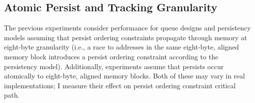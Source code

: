 %
%
%
%

\subsection{Atomic Persist and Tracking Granularity}
\label{section:Evaluation:Granularity}

The previous experiments consider performance for queue designs and persistency models assuming that persist ordering constraints propagate through memory at eight-byte granularity (i.e., a race to addresses in the same eight-byte, aligned memory block introduces a persist ordering constraint according to the persistency model).
Additionally, experiments assume that persists occur atomically to eight-byte, aligned memory blocks.
Both of these may vary in real implementations; I measure their effect on persist ordering constraint critical path.

